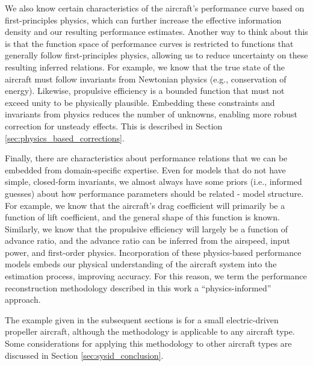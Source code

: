 We also know certain characteristics of the aircraft's performance curve based on first-principles physics, which can further increase the effective information density and our resulting performance estimates. Another way to think about this is that the function space of performance curves is restricted to functions that generally follow first-principles physics, allowing us to reduce uncertainty on these resulting inferred relations. For example, we know that the true state of the aircraft must follow invariants from Newtonian physics (e.g., conservation of energy). Likewise, propulsive efficiency is a bounded function that must not exceed unity to be physically plausible. Embedding these constraints and invariants from physics reduces the number of unknowns, enabling more robust correction for unsteady effects. This is described in Section \ref{sec:physics_based_corrections}.

Finally, there are characteristics about performance relations that we can be embedded from domain-specific expertise. Even for models that do not have simple, closed-form invariants, we almost always have some priors (i.e., informed guesses) about how performance parameters should be related - model structure. For example, we know that the aircraft's drag coefficient will primarily be a function of lift coefficient, and the general shape of this function is known. Similarly, we know that the propulsive efficiency will largely be a function of advance ratio, and the advance ratio can be inferred from the airspeed, input power, and first-order physics. Incorporation of these physics-based performance models embeds our physical understanding of the aircraft system into the estimation process, improving accuracy. For this reason, we term the performance reconstruction methodology described in this work a ``physics-informed'' approach.

The example given in the subsequent sections is for a small electric-driven propeller aircraft, although the methodology is applicable to any aircraft type. Some considerations for applying this methodology to other aircraft types are discussed in Section \ref{sec:sysid_conclusion}.

